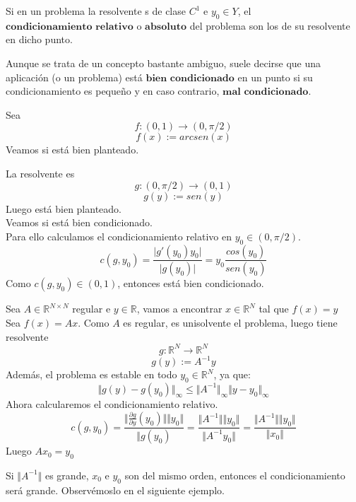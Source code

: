 \begin{ndef}
Si en un problema la resolvente s de clase $C^1$ e $y_0 \in Y$, el $\textbf{condicionamiento relativo}$ o $\textbf{absoluto}$ del problema son los de su resolvente en dicho punto.
\end{ndef}

\begin{nota}
Aunque se trata de un concepto bastante ambiguo, suele decirse que una aplicación (o un problema) está $\textbf{bien condicionado}$ en un punto si su condicionamiento es pequeño y en caso contrario, $\textbf{mal condicionado}$.
\end{nota}

\begin{ejemplo}
Sea $$f : (0,1) \rightarrow (0, \pi / 2)$$ $$f(x) := arcsen(x)$$
Veamos si está bien planteado.

La resolvente es $$g : (0, \pi / 2) \rightarrow (0,1)$$ $$g(y) := sen(y)$$
Luego está bien planteado.\\
Veamos si está bien condicionado.\\ Para ello calculamos el condicionamiento relativo en $y_0 \in (0, \pi / 2)$.\\
\[ c(g,y_0) = \frac{\vert g'(y_0)y_0 \vert }{\vert g(y_0) \vert} = y_0 \frac{cos(y_0)}{sen(y_0)} \]
Como $c(g,y_0) \in (0,1)$, entonces está bien condicionado.
\end{ejemplo}

\begin{ejemplo}
Sea $A \in \mathbb{R}^{N \times N}$ regular e $y \in \mathbb{R}$, vamos a encontrar $x \in \mathbb{R}^N$ tal que $f(x) = y$\\
Sea $f(x) = Ax$. Como $A$ es regular, es unisolvente el problema, luego tiene resolvente $$g : \mathbb{R}^N \rightarrow \mathbb{R}^N$$ $$g(y) := A^{-1}y$$
Además, el problema es estable en todo $y_0 \in \mathbb{R}^N$, ya que:
\[ \Vert g(y) - g(y_0) \Vert _\infty \leq \Vert A^{-1} \Vert _\infty \Vert y - y_0 \Vert _\infty \]
Ahora calcularemos el condicionamiento relativo.
\[ c(g, y_0) = \frac{\Vert \frac{\partial g}{\partial y} (y_0) \Vert \Vert y_0 \Vert }{\Vert g(y_0)} = \frac{\Vert A^{-1} \Vert \Vert y_0 \Vert }{\Vert A^{-1} y_0 \Vert } = \frac{\Vert A^{-1} \Vert \Vert y_0 \Vert }{\Vert x_0 \Vert } \] 
Luego $Ax_0 = y_0$
\end{ejemplo}

Si $\Vert A^{-1} \Vert$ es grande, $x_0$ e $y_0$ son del mismo orden, entonces el condicionamiento será grande. Observémoslo en el siguiente ejemplo.

